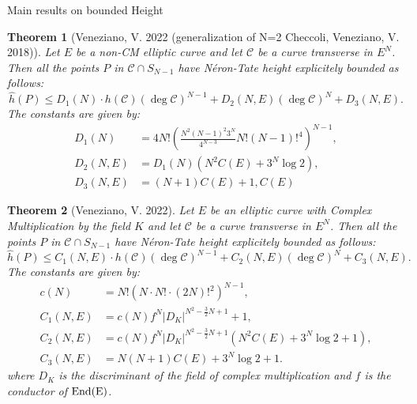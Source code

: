 \documentclass[12pt]{beamer}
\newcommand{\Ci}{\mathcal{C}}
\newtheorem{thm}{Theorem}
\begin{document}
\begin{frame}{Main results on bounded Height}
\begin{thm} [Veneziano, V. 2022 (generalization of N=2 Checcoli, Veneziano, V. 2018)]
  Let $E$ be a non-CM elliptic curve   and let $\Ci$ be a curve transverse  in $E^N$. Then all the points $P$  in  $\Ci\cap S_{N-1}$ have N\'eron-Tate height explicitely bounded as follows:
   \begin{equation*}
      \hat h(P)\leq D_1(N)\cdot h(\Ci)(\deg\Ci)^{N-1} +D_2(N,E)(\deg\Ci)^N+D_3(N,E).
\end{equation*}
The constants are given by:
\begin{align*}
    D_1(N)&=4N!\left(\frac{N^2 (N-1)^2 3^N}{4^{N-3}}N! (N-1)!^4\right)^{N-1},\\
  D_2(N,E)&=D_1(N)\left(N^2C(E)+3^{N}\log 2\right),\\
  D_3(N,E)&=(N+1)C(E)+1,   
  C(E)
 \end{align*}  
  \end{thm}
  
\end{frame}






\begin{frame}
\begin{thm} [Veneziano, V. 2022]
  Let $E$ be an elliptic curve with Complex Multiplication by the field $K$ and let $\Ci$ be a curve transverse  in $E^N$. Then all the points $P$ in $\Ci\cap S_{N-1}$ have N\'eron-Tate height explicitely bounded as follows:
   \begin{equation*}
      \hat h(P)\leq C_1(N,E)\cdot h(\Ci)(\deg\Ci)^{N-1} +C_2(N,E)(\deg\Ci)^N +C_3(N,E).
\end{equation*}
The constants are given by:
\begin{align*}
 c(N)&=N!\left(N\cdot N!\cdot (2N)!^2\right)^{N-1},\\
  C_1(N,E)&=c(N)f^N|D_K|^{N^2-\frac{3}{2}N+1}+1,\\
   C_2(N,E)&=c(N)f^N|D_K|^{N^2-\frac{3}{2}N+1}\left(N^2C(E)+3^{N}\log 2+1\right),\\
  C_3(N,E)&=N(N+1)C(E)+3^{N}\log 2+1.
 \end{align*}  
 where $D_K$ is the discriminant of the field of complex multiplication and $f$ is the conductor of $\rm{End}(E)$. 
  \end{thm}
  
\end{frame}
\end{document}
